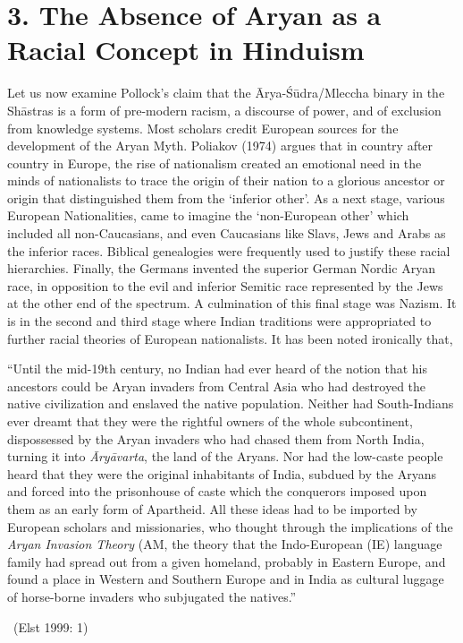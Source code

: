 \section*{3. The Absence of Aryan as a Racial Concept in Hinduism}

Let us now examine Pollock’s claim that the Ārya-Śūdra/Mleccha binary in the Shāstras is a form of pre-modern racism, a discourse of power, and of exclusion from knowledge systems. Most scholars credit European sources for the development of the Aryan Myth. Poliakov (1974) argues that in country after country in Europe, the rise of nationalism created an emotional need in the minds of nationalists to trace the origin of their nation to a glorious ancestor or origin that distinguished them from the ‘inferior other’. As a next stage, various European Nationalities, came to imagine the ‘non-European other’ which included all non-Caucasians, and even Caucasians like Slavs, Jews and Arabs as the inferior races. Biblical genealogies were frequently used to justify these racial hierarchies. Finally, the Germans invented the superior German Nordic Aryan race, in opposition to the evil and inferior Semitic race represented by the Jews at the other end of the spectrum. A culmination of this final stage was Nazism. It is in the second and third stage where Indian traditions were appropriated to further racial theories of European nationalists. It has been noted ironically that,

\begin{myquote}
“Until the mid-19th century, no Indian had ever heard of the notion that his ancestors could be Aryan invaders from Central Asia who had destroyed the native civilization and enslaved the native population. Neither had South-Indians ever dreamt that they were the rightful owners of the whole subcontinent, dispossessed by the Aryan invaders who had chased them from North India, turning it into \textit{Āryāvarta}, the land of the Aryans. Nor had the low-caste people heard that they were the original inhabitants of India, subdued by the Aryans and forced into the prisonhouse of caste which the conquerors imposed upon them as an early form of Apartheid. All these ideas had to be imported by European scholars and missionaries, who thought through the implications of the \textit{Aryan Invasion Theory} (AM, the theory that the Indo-European (IE) language family had spread out from a given homeland, probably in Eastern Europe, and found a place in Western and Southern Europe and in India as cultural luggage of horse-borne invaders who subjugated the natives.” 

~\hfill (Elst 1999: 1)
\end{myquote}

